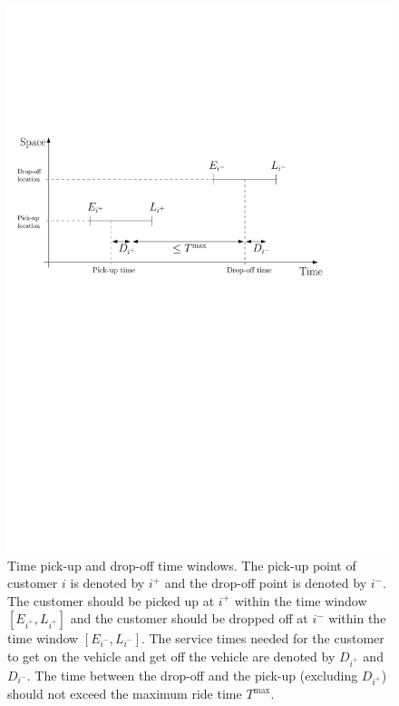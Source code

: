 \documentclass[dissertation,draft*]{aaltoseries}
\begin{document}
\begin{figure}[ht]
\begin{center}
\includegraphics[width=0.9 \columnwidth]{timeline01}
\caption{Time pick-up and drop-off time windows. The pick-up point of
customer $i$ is denoted by $i^{+}$ and the drop-off point is denoted by $i^{-}$.
The customer should be picked up at $i^{+}$ within the time window $[E_{i^+},L_{i^+}]$
and the customer should be dropped off at $i^{-}$ within the time window $[E_{i^{-}},L_{i^{-}}]$.
The service times needed for the customer to get on the vehicle
and get off the vehicle are denoted by $D_{i^+}$ and $D_{i^-}$. The time between
the drop-off and the pick-up (excluding $D_{i^+}$) should not exceed the maximum ride time $T^{\max}$.
}
\label{timeline01}
\end{center}
\end{figure}
\end{document}
